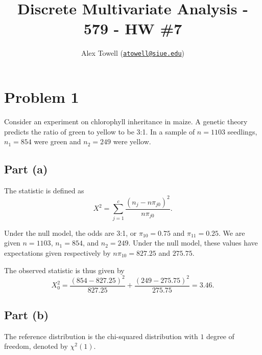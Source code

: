 \documentclass[
]{article}
\title{Discrete Multivariate Analysis - 579 - HW \#7}
\author{Alex Towell
(\href{mailto:atowell@siue.edu}{\nolinkurl{atowell@siue.edu}})}
\date{}
\begin{document}
\maketitle

\newcommand{\var}{\operatorname{Var}}
\newcommand{\expect}{\operatorname{E}}
\newcommand{\corr}{\operatorname{Corr}}
\newcommand{\cov}{\operatorname{Cov}}
\newcommand{\ssr}{\operatorname{SSR}}
\newcommand{\se}{\operatorname{SE}}
\newcommand{\mat}[1]{\mathbf{#1}}
\newcommand{\RR}{\operatorname{RR}}
\newcommand{\eval}[2]{\left. #1 \right\vert_{#2}}

\hypertarget{problem-1}{%
\section{Problem 1}\label{problem-1}}

Consider an experiment on chlorophyll inheritance in maize. A genetic
theory predicts the ratio of green to yellow to be 3:1. In a sample of
\(n = 1103\) seedlings, \(n_1 = 854\) were green and \(n_2 = 249\) were
yellow.

\hypertarget{part-a}{%
\subsection{Part (a)}\label{part-a}}


The statistic is defined as \[
  X^2 = \sum_{j=1}^{c} \frac{(n_j - n \pi_{j 0})^2}{n \pi_{j 0}}.
\]

Under the null model, the odds are 3:1, or \(\pi_{1 0} = 0.75\) and
\(\pi_{1 1} = 0.25\). We are given \(n = 1103\), \(n_1 = 854\), and
\(n_2 = 249\). Under the null model, these values have expectations
given respectively by \(n \pi_{1 0} = 827.25\) and \(275.75\).

The observed statistic is thus given by \[
  X_0^2 = \frac{(854 - 827.25)^2}{827.25} + \frac{(249 - 275.75)^2}{275.75} = 3.46.
\]

\hypertarget{part-b}{%
\subsection{Part (b)}\label{part-b}}


The reference distribution is the chi-squared distribution with \(1\)
degree of freedom, denoted by \(\chi^2(1)\).
\end{document}
